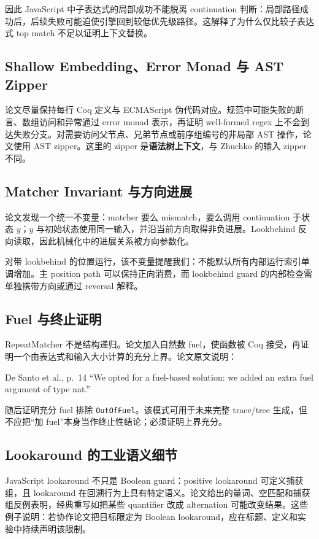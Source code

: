 \documentclass[UTF8,a4paper,12pt]{ctexart}
\begin{document}
因此 JavaScript 中子表达式的局部成功不能脱离 continuation 判断：局部路径成功后，后续失败可能迫使引擎回到较低优先级路径。这解释了为什么仅比较子表达式 top match 不足以证明上下文替换。

\subsection{Shallow Embedding、Error Monad 与 AST Zipper}

论文尽量保持每行 Coq 定义与 ECMAScript 伪代码对应。规范中可能失败的断言、数组访问和异常通过 error monad 表示，再证明 well-formed regex 上不会到达失败分支。对需要访问父节点、兄弟节点或前序组编号的非局部 AST 操作，论文使用 AST zipper。这里的 zipper 是\textbf{语法树上下文}，与 Zhuchko 的输入 zipper 不同。

\subsection{Matcher Invariant 与方向进展}

论文发现一个统一不变量：matcher 要么 mismatch，要么调用 continuation 于状态 $y$；$y$ 与初始状态使用同一输入，并沿当前方向取得非负进展。Lookbehind 反向读取，因此机械化中的进展关系被方向参数化\cite[pp.~7--8,17]{desanto2024}。

对带 lookbehind 的位置运行，该不变量提醒我们：不能默认所有内部运行索引单调增加。主 position path 可以保持正向消费，而 lookbehind guard 的内部检查需单独携带方向或通过 reversal 解释。

\subsection{Fuel 与终止证明}

RepeatMatcher 不是结构递归。论文加入自然数 fuel，使函数被 Coq 接受，再证明一个由表达式和输入大小计算的充分上界。论文原文说明：
\begin{paperquote}{De Santo et al., p.~14}
``We opted for a fuel-based solution: we added an extra fuel argument of type nat.''
\end{paperquote}
随后证明充分 fuel 排除 \texttt{OutOfFuel}。该模式可用于未来完整 trace/tree 生成，但不应把“加 fuel”本身当作终止性结论；必须证明上界充分。

\subsection{Lookaround 的工业语义细节}

JavaScript lookaround 不只是 Boolean guard：positive lookaround 可定义捕获组，且 lookaround 在回溯行为上具有特定语义。论文给出的量词、空匹配和捕获组反例表明，经典重写如把某些 quantifier 改成 alternation 可能改变结果。这些例子说明：若协作论文把目标限定为 Boolean lookaround，应在标题、定义和实验中持续声明该限制。
\end{document}
